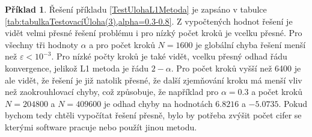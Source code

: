 \documentclass[a4paper,12pt,twoside]{article}
\theoremstyle{definition}
\newtheorem{prikl}[veta]{Příklad}
\theoremstyle{remark}
\numberwithin{equation}{section}
\numberwithin{table}{section}
\numberwithin{figure}{section}
\begin{document}
\begin{prikl}
Řešení příkladu \ref{TestUlohaL1Metoda} je zapsáno v tabulce \ref{tab:tabulkaTestovacíÚloha(3),alpha=0.3-0.8}. Z vypočtených hodnot řešení je vidět velmi přesné řešení problému i pro nízký počet kroků je vcelku přesné. Pro všechny tři hodnoty $\alpha$ a pro počet kroků $N = 1600$ je globální chyba řešení menší než $\varepsilon < 10^{-3}$. Pro nízké počty kroků je také vidět, vcelku přesný odhad řádu konvergence, jelikož L1 metoda je řádu $2 - \alpha$. Pro počet kroků vyšší než 6400 je ale vidět, že řešení je již natolik přesné, že další zjemňování kroku má menší vliv než zaokrouhlovací chyby, což způsobuje, že například pro $\alpha = 0.3$ a počet kroků $N = 204800$ a $N = 409600$ je odhad chyby na hodnotách $6.8216$ a $-5.0735$. Pokud bychom tedy chtěli vypočítat řešení přesně, bylo by potřeba zvýšit počet cifer se kterými software pracuje nebo použít jinou metodu.


\end{prikl}
\end{document}
